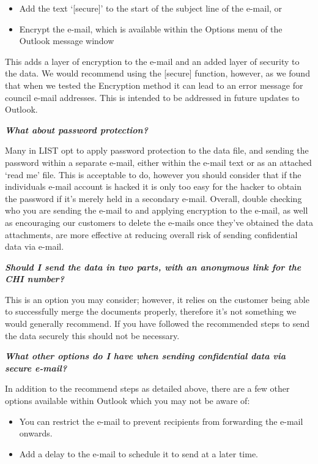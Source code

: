 \documentclass[
]{book}
\begin{document}
\begin{enumerate}
  \begin{itemize}
  \item
    Add the text `{[}secure{]}' to the start of the subject line of the e-mail, or
  \item
    Encrypt the e-mail, which is available within the Options menu of the Outlook message window
  \end{itemize}

  This adds a layer of encryption to the e-mail and an added layer of security to the data. We would recommend using the {[}secure{]} function, however, as we found that when we tested the Encryption method it can lead to an error message for council e-mail addresses. This is intended to be addressed in future updates to Outlook.
\end{enumerate}

\emph{\textbf{What about password protection?}}

Many in LIST opt to apply password protection to the data file, and sending the password within a separate e-mail, either within the e-mail text or as an attached `read me' file. This is acceptable to do, however you should consider that if the individuals e-mail account is hacked it is only too easy for the hacker to obtain the password if it's merely held in a secondary e-mail. Overall, double checking who you are sending the e-mail to and applying encryption to the e-mail, as well as encouraging our customers to delete the e-mails once they've obtained the data attachments, are more effective at reducing overall risk of sending confidential data via e-mail.

\emph{\textbf{Should I send the data in two parts, with an anonymous link for the CHI number?}}

This is an option you may consider; however, it relies on the customer being able to successfully merge the documents properly, therefore it's not something we would generally recommend. If you have followed the recommended steps to send the data securely this should not be necessary.

\emph{\textbf{What other options do I have when sending confidential data via secure e-mail?}}

In addition to the recommend steps as detailed above, there are a few other options available within Outlook which you may not be aware of:

\begin{itemize}
\item
  You can restrict the e-mail to prevent recipients from forwarding the e-mail onwards.
\item
  Add a delay to the e-mail to schedule it to send at a later time.
\end{itemize}
\end{document}
